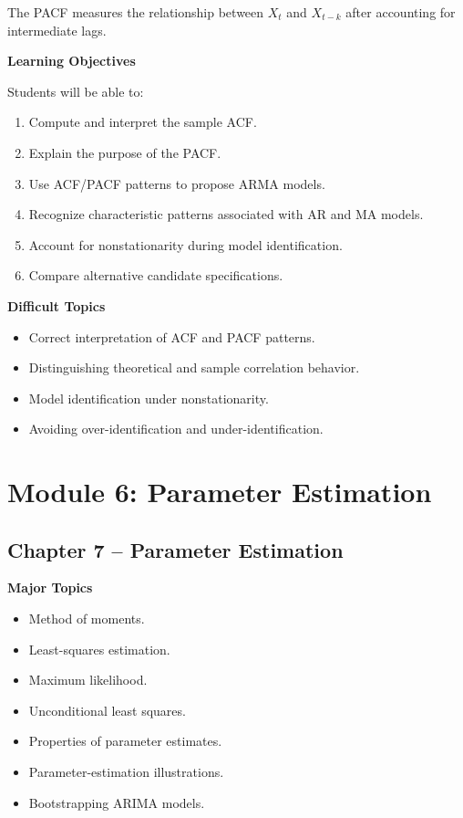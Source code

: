 \documentclass[11pt,a4paper]{article}
\begin{document}
The PACF measures the relationship between $X_t$ and $X_{t-k}$ after
accounting for intermediate lags.

\textbf{Learning Objectives}

Students will be able to:

\begin{enumerate}
    \item Compute and interpret the sample ACF.
    \item Explain the purpose of the PACF.
    \item Use ACF/PACF patterns to propose ARMA models.
    \item Recognize characteristic patterns associated with AR and MA models.
    \item Account for nonstationarity during model identification.
    \item Compare alternative candidate specifications.
\end{enumerate}

\textbf{Difficult Topics}

\begin{itemize}
    \item Correct interpretation of ACF and PACF patterns.
    \item Distinguishing theoretical and sample correlation behavior.
    \item Model identification under nonstationarity.
    \item Avoiding over-identification and under-identification.
\end{itemize}

\section{Module 6: Parameter Estimation}

\subsection{Chapter 7 -- Parameter Estimation}

\textbf{Major Topics}

\begin{itemize}
    \item Method of moments.
    \item Least-squares estimation.
    \item Maximum likelihood.
    \item Unconditional least squares.
    \item Properties of parameter estimates.
    \item Parameter-estimation illustrations.
    \item Bootstrapping ARIMA models.
\end{itemize}
\end{document}

